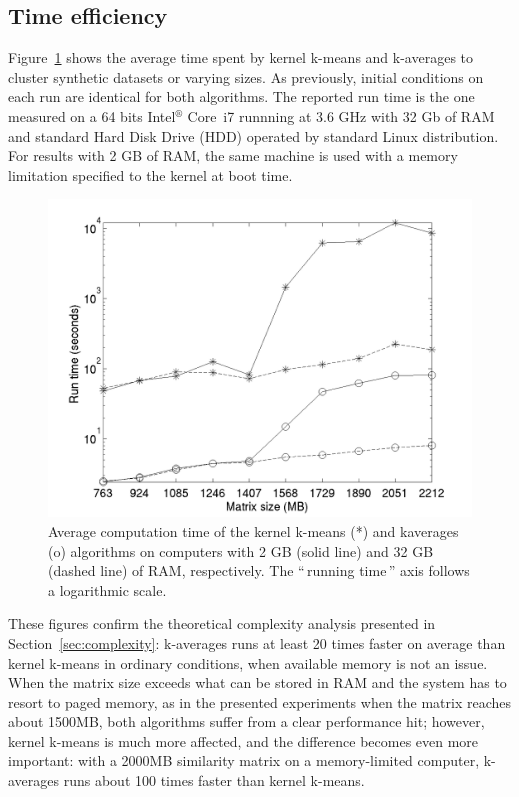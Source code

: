 \documentclass[natbib,smallextended]{svjour3}
\newcommand{\gl}[1]{``\,#1\,''} %
\begin{document}
\subsection{Time efficiency}

Figure~\ref{fig:timing} shows the average time spent by kernel k-means and k-averages to cluster synthetic datasets or varying sizes. As previously, initial conditions on each run are identical for both algorithms. The reported run time is the one measured on a 64 bits Intel$^\circledR$ Core\texttrademark   \, i7 runnning at 3.6 GHz with 32 Gb of RAM and standard Hard Disk Drive (HDD)  operated by standard Linux distribution. For results with 2 GB of RAM, the same machine is used with a memory limitation specified to the kernel at boot time.

\begin{figure}
\center
\includegraphics[width= .7\textwidth]{figures/simpleSwap.png}
\caption{Average computation time of the kernel k-means (*) and kaverages (o) algorithms on computers with 2 GB (solid line) and 32 GB (dashed line) of RAM, respectively. The \gl{running time} axis follows a logarithmic scale.}
\label{fig:timing}
\end{figure}

These figures confirm the theoretical complexity analysis presented in Section~\ref{sec:complexity}: k-averages runs at least 20 times faster on average than kernel k-means in ordinary conditions, when  available memory is not an issue. When the matrix size exceeds what can be stored in RAM and the system has to resort to paged memory, as in the presented experiments when the matrix reaches about 1500MB, both algorithms suffer from a clear performance hit; however, kernel k-means is much more affected, and the difference becomes even more important: with a 2000MB similarity matrix on a memory-limited computer, k-averages runs about 100 times faster than kernel k-means.
\end{document}
